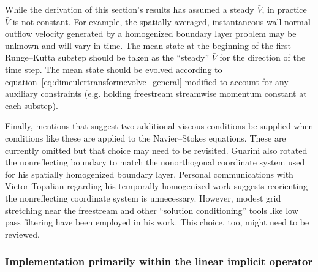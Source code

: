\documentclass[letterpaper,11pt,nointlimits,reqno,draft]{amsbook}
\begin{document}
While the derivation of this section's results has assumed a steady $\bar{V}$,
in practice $\bar{V}$ is not constant.  For example, the spatially averaged,
instantaneous wall-normal outflow velocity generated by a homogenized boundary
layer problem may be unknown and will vary in time.  The mean state at the
beginning of the first Runge--Kutta substep should be taken as the ``steady''
$\bar{V}$ for the direction of the time step.  The mean state should be evolved
according to equation~\eqref{eq:dimeulertransformevolve_general} modified to
account for any auxiliary constraints (e.g. holding freestream streamwise
momentum constant at each substep).

Finally, \citet{Guarini1998} mentions that \citet{Poinsot1992Boundary}
suggest two additional viscous conditions be supplied when conditions like
these are applied to the Navier--Stokes equations.  These are currently omitted
but that choice may need to be revisited.  Guarini also rotated the
nonreflecting boundary to match the nonorthogonal coordinate system used for
his spatially homogenized boundary layer.  Personal communications with Victor
Topalian regarding his temporally homogenized work suggests reorienting the
nonreflecting coordinate system is unnecessary.  However, modest grid
stretching near the freestream and other ``solution conditioning'' tools like
low pass filtering have been employed in his work.  This choice, too, might
need to be reviewed.

\subsubsection{Implementation primarily within the linear implicit operator}
\label{sec:nrbc_mostly_implicit}
\end{document}
